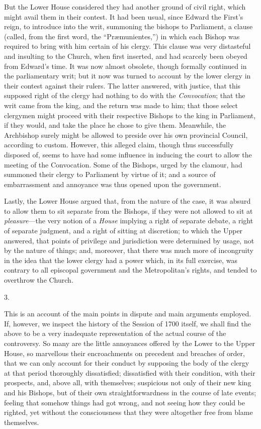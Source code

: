 But the Lower House considered
they had another ground of civil right, which might avail them in
their contest. It had been usual, since Edward the First's reign, to
introduce into the writ, summoning the bishops to Parliament, a clause
(called, from the first word, the ``Præmunientes,'') in which
each Bishop was required to bring with him certain of his clergy. This
clause was very distasteful and insulting to the Church, when first
inserted, and had scarcely been obeyed from Edward's time. It was now
almost obsolete, though formally continued in the parliamentary writ;
but it now was turned to account by the lower clergy in their contest
against their rulers. The latter answered, with justice, that this
supposed right of the clergy had nothing to do with the \emph{Convocation};
that the writ came from the king, and the return was made to him; that
those select clergymen might proceed with their respective Bishops to
the king in Parliament, if they would, and take the place he chose to
give them. Meanwhile, the Archbishop surely might be allowed to
preside over his own provincial Council, according to custom. However,
this alleged claim, though thus successfully disposed of, seems to
have had some influence in inducing the court to allow the meeting of
the Convocation. Some of the Bishops, urged by the clamour, had
summoned their clergy to Parliament by virtue of it; and a source of
embarrassment and annoyance was thus opened upon the government.

Lastly, the Lower House argued
that, from the nature of the case, it was absurd to allow them to sit
separate from the Bishops, if they were not allowed to sit at \emph{pleasure}—the
very notion of a \emph{House} implying a right of separate debate, a
right of separate judgment, and a right of sitting at discretion; to
which the Upper answered, that points of privilege and jurisdiction
were determined by usage, not by the nature of things; and, moreover,
that there was much more of incongruity in the idea that the lower
clergy had a power which, in its full exercise, was contrary to all
episcopal government and the Metropolitan's rights, and tended
to overthrow the Church.

3.

This is an account of the main
points in dispute and main arguments employed. If, however, we inspect
the history of the Session of 1700 itself, we shall find the above to
be a very inadequate representation of the actual course of the
controversy. So many are the little annoyances offered by the Lower to
the Upper House, so marvellous their encroachments on precedent and
breaches of order, that we can only account for their conduct by
supposing the body of the clergy at that period thoroughly
dissatisfied; dissatisfied with their condition, with their prospects,
and, above all, with themselves; suspicious not only of their new king
and his Bishops, but of their own straightforwardness in the course of
late events; feeling that somehow things had got wrong, and not seeing
how they could be righted, yet without the consciousness that they
were altogether free from blame themselves.

